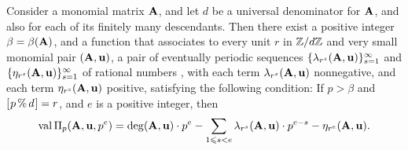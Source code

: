 \documentclass{article}
\begin{document}
\begin{theorem}
   \label{main theorem wrt diagonal: T}
   Consider a monomial matrix $\mathbf{A}$, and let $d$ be a universal denominator for $\mathbf{A}$, and also for each of its finitely many descendants.  Then there exist a positive integer $\beta = \beta(\mathbf{A})$, and a function that associates to every unit $r$ in $\mathbb{Z}/d\mathbb{Z}$ and very small monomial pair $(\mathbf{A}, \mathbf{u})$, a pair of eventually periodic sequences $\{ \lambda_{r^s}(\mathbf{A}, \mathbf{u})\}_{s=1}^{\infty}$  and $\{ \eta_{r^s}(\mathbf{A}, \mathbf{u}) \}_{s=1}^{\infty}$ of rational numbers%
   , with each term $\lambda_{r^s}(\mathbf{A}, \mathbf{u})$  nonnegative, and each term $\eta_{r^s}(\mathbf{A}, \mathbf{u})$  positive, satisfying the following condition:  If $p > \beta$ and $[ \hspace{.01in} p \, \% \, d \hspace{.01in} ] = r$, and $e$ is a positive integer, then
%
\[
 \operatorname{val} \Pi_p(\mathbf{A},\mathbf{u}, p^e) =  \operatorname{deg}(\mathbf{A},\mathbf{u}) \cdot p^e - \sum_{1 \leqslant s < e} \lambda_{r^s}(\mathbf{A}, \mathbf{u}) \cdot  p^{e-s} - \eta_{r^e}(\mathbf{A},\mathbf{u}).
   \]%


 

%
\end{theorem}
\end{document}
